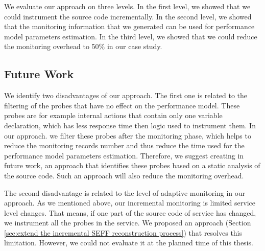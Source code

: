 We evaluate our approach on three levels. In the first level, we showed that we could instrument the source code incrementally. In the second level, we showed that the monitoring information that we generated can be used for performance model parameters estimation. In the third level, we showed that we could reduce the monitoring overhead to 50\% in our case study. 
   
\subsection{Future Work}
\label{sec:future work}
We identify two disadvantages of our approach. The first one is related to the filtering of the probes that have no effect on the performance model. These probes are for example internal actions that contain only one variable declaration, which has less response time then logic used to instrument them. In our approach. we filter these probes after the monitoring phase, which helps to reduce the monitoring records number and thus reduce the time used for the performance model parameters estimation. Therefore, we suggest creating in future work, an approach that identifies these probes based on a static analysis of the source code. Such an approach will also reduce the monitoring overhead. 

The second disadvantage is related to the level of adaptive monitoring in our approach. As we mentioned above, our incremental monitoring is limited service level changes. That means, if one part of the source code of service has changed, we instrument all the probes in the service. We proposed an approach (Section \ref{sec:extend the incremental SEFF reconstruction process}) that resolves this limitation. However, we could not evaluate it at the planned time of this thesis.    